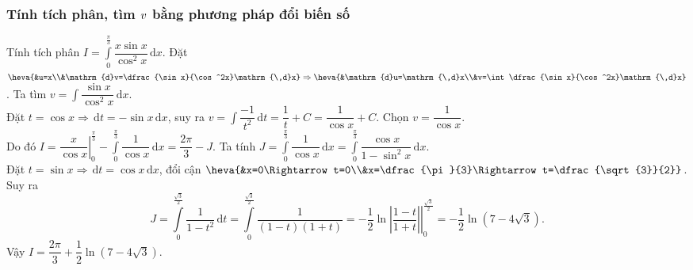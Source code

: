 \subsubsection{Tính tích phân, tìm $\lowercase{v}$ bằng phương pháp đổi biến số}
\begin{ex}%
	Tính tích phân $\displaystyle I=\int\limits_{0}^{\frac{\pi}{3}}\dfrac{x\sin x}{\cos^2x}\mathrm{\,d}x$.
	\loigiai
	{
		Đặt $\displaystyle \heva{&u=x\\&\mathrm{d}v=\dfrac{\sin x}{\cos^2x}\mathrm{\,d}x}\Rightarrow\heva{&\mathrm{d}u=\mathrm{\,d}x\\&v=\int\dfrac{\sin x}{\cos^2x}\mathrm{\,d}x}$. Ta tìm $\displaystyle v=\int\dfrac{\sin x}{\cos^2x}\mathrm{\,d}x$.\\
		Đặt $t=\cos x\Rightarrow \mathrm{\,d}t=-\sin x\mathrm{\,d}x$, suy ra $\displaystyle v=\int\dfrac{-1}{t^2}\mathrm{\,d}t=\dfrac{1}{t}+C=\dfrac{1}{\cos x}+C$. Chọn $v=\dfrac{1}{\cos x}$.\\
		Do đó $\displaystyle I=\left.\dfrac{x}{\cos x}\right|_{0}^{\frac{\pi}{3}}-\int\limits_0^{\frac{\pi}{3}}\dfrac{1}{\cos x}\mathrm{\,d}x=\dfrac{2\pi}{3}-J$. Ta tính $\displaystyle J=\int\limits_0^{\frac{\pi}{3}}\dfrac{1}{\cos x}\mathrm{\,d}x=\int\limits_0^{\frac{\pi}{3}}\dfrac{\cos x}{1-\sin^2 x}\mathrm{\,d}x$.\\
		Đặt $t=\sin x\Rightarrow \mathrm{\,d}t=\cos x\mathrm{\,d}x$, đổi cận $\heva{&x=0\Rightarrow t=0\\&x=\dfrac{\pi}{3}\Rightarrow t=\dfrac{\sqrt{3}}{2}}$. Suy ra
		\[J=\int\limits_0^{\frac{\sqrt{3}}{2}}\dfrac{1}{1-t^2}\mathrm{\,d}t=\int\limits_0^{\frac{\sqrt{3}}{2}}\dfrac{1}{(1-t)(1+t)}=-\dfrac{1}{2}\left.\ln \left|\dfrac{1-t}{1+t}\right|\right|_0^{\frac{\sqrt{3}}{2}}=-\dfrac{1}{2}\ln (7-4\sqrt{3}).\]
		Vậy $I=\dfrac{2\pi}{3}+\dfrac{1}{2}\ln (7-4\sqrt{3})$.
	}
\end{ex}
